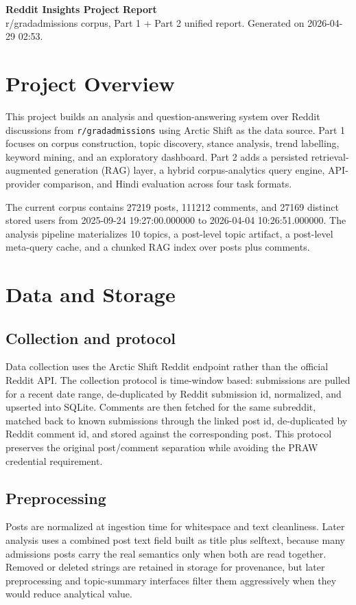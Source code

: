 \documentclass[11pt]{article}
\begin{document}
        {\LARGE \textbf{Reddit Insights Project Report}}\\
        r/gradadmissions corpus, Part 1 + Part 2 unified report. Generated on 2026-04-29 02:53.

        \section*{Project Overview}
        This project builds an analysis and question-answering system over Reddit discussions from \texttt{r/gradadmissions} using Arctic Shift as the data source. Part 1 focuses on corpus construction, topic discovery, stance analysis, trend labelling, keyword mining, and an exploratory dashboard. Part 2 adds a persisted retrieval-augmented generation (RAG) layer, a hybrid corpus-analytics query engine, API-provider comparison, and Hindi evaluation across four task formats.

        The current corpus contains 27219 posts, 111212 comments, and 27169 distinct stored users from 2025-09-24 19:27:00.000000 to 2026-04-04 10:26:51.000000. The analysis pipeline materializes 10 topics, a post-level topic artifact, a post-level meta-query cache, and a chunked RAG index over posts plus comments.

        \section*{Data and Storage}
        \subsection*{Collection and protocol}
        Data collection uses the Arctic Shift Reddit endpoint rather than the official Reddit API. The collection protocol is time-window based: submissions are pulled for a recent date range, de-duplicated by Reddit submission id, normalized, and upserted into SQLite. Comments are then fetched for the same subreddit, matched back to known submissions through the linked post id, de-duplicated by Reddit comment id, and stored against the corresponding post. This protocol preserves the original post/comment separation while avoiding the PRAW credential requirement.

        \subsection*{Preprocessing}
        Posts are normalized at ingestion time for whitespace and text cleanliness. Later analysis uses a combined post text field built as title plus selftext, because many admissions posts carry the real semantics only when both are read together. Removed or deleted strings are retained in storage for provenance, but later preprocessing and topic-summary interfaces filter them aggressively when they would reduce analytical value.
\end{document}
